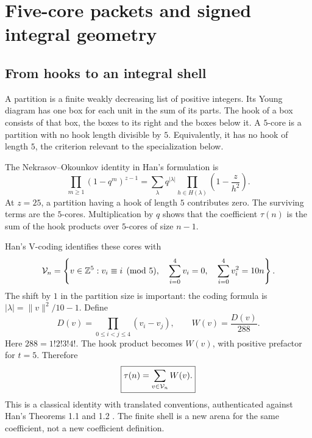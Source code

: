 \chapter{Five-core packets and signed integral geometry}\label{ch:packets}
\section{From hooks to an integral shell}
A partition is a finite weakly decreasing list of positive integers. Its Young diagram has one box for each unit in the sum of its parts. The hook of a box consists of that box, the boxes to its right and the boxes below it. A $5$-core is a partition with no hook length divisible by $5$. Equivalently, it has no hook of length $5$, the criterion relevant to the specialization below.

The Nekrasov--Okounkov identity in Han's formulation is
\begin{equation}\label{eq:hookidentity}
\prod_{m\ge1}(1-q^m)^{z-1}
=\sum_\lambda q^{|\lambda|}\prod_{h\in H(\lambda)}\left(1-\frac z{h^2}\right).
\end{equation}
At $z=25$, a partition having a hook of length $5$ contributes zero. The surviving terms are the $5$-cores. Multiplication by $q$ shows that the coefficient $\tau(n)$ is the sum of the hook products over $5$-cores of size $n-1$.

Han's V-coding identifies these cores with
\begin{equation}\label{eq:shell}
\mathcal V_n=\left\{v\in\mathbb Z^5:
v_i\equiv i\pmod5,\quad\sum_{i=0}^4v_i=0,\quad
\sum_{i=0}^4v_i^2=10n\right\}.
\end{equation}
The shift by $1$ in the partition size is important: the coding formula is $|\lambda|=\|v\|^2/10-1$. Define
\begin{equation}\label{eq:weight}
D(v)=\prod_{0\le i<j\le4}(v_i-v_j),\qquad W(v)=\frac{D(v)}{288}.
\end{equation}
Here $288=1!2!3!4!$. The hook product becomes $W(v)$, with positive prefactor for $t=5$. Therefore
\begin{equation}\label{eq:packettau}
\boxed{\tau(n)=\sum_{v\in\mathcal V_n}W(v).}
\end{equation}
This is a classical identity with translated conventions, authenticated against Han's Theorems 1.1 and 1.2 \cite{Han}. The finite shell is a new arena for the same coefficient, not a new coefficient definition.


